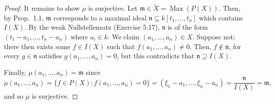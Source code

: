 \documentclass[12pt,letterpaper]{article}
\theoremstyle{definition}
\theoremstyle{remark}
\numberwithin{figure}{problem}
\numberwithin{equation}{section}
\DeclareMathOperator{\Max}{Max}
\begin{document}
\begin{proof}
  It remains to show
  $\mu$ is surjective.
  Let
  $\mathfrak{m} \in \tilde{X} =
  \Max(P(X))$.
  Then, by Prop.~1.1,
  $\mathfrak{m}$ corresponds to a maximal ideal
  $\mathfrak{n} \subseteq
  k[t_1,\ldots,t_n]$ which contains
  $I(X)$.
  By the weak Nullstellensatz (Exercise 5.17),
  $\mathfrak{n}$ is of the form
  $(t_1 -
  a_1,\ldots,t_n-a_n)$ where
  $a_i \in
  k$.
  We claim
  $(a_1,\ldots,a_n) \in
  X$.
  Suppose not; there then exists some
  $f \in
  I(X)$ such that
  $f(a_1,\ldots,a_n) \ne
  0$.
  Then,
  $f \notin
  \mathfrak{n}$, for every
  $g \in
  \mathfrak{n}$ satisfies
  $g(a_1,\ldots,a_n) =
  0$, but this contradicts that
  $\mathfrak{n} \supseteq
  I(X)$.
  \par Finally,
  $\mu(a_1,\ldots,a_n) =
  \mathfrak{m}$ since
  \begin{equation*}
    \mu(a_1,\ldots,a_n) = \{f \in P(X) : f(a_1,\ldots,a_n) = 0\} = (\xi_1 - a_1,\ldots,\xi_n-a_n) = \frac{\mathfrak{n}}{I(X)} = \mathfrak{m},
  \end{equation*}
  and so
  $\mu$ is surjective.
\end{proof}
\end{document}
